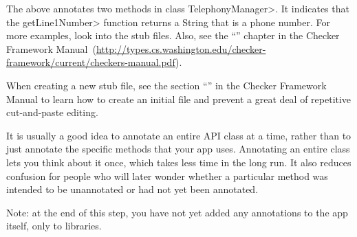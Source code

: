 \noindent
The above annotates two methods in class \<TelephonyManager>.
It indicates that the \<getLine1Number> function returns a String that is a
phone number.  For more examples, look into the stub files. Also, see 
the
``'' chapter in the Checker Framework Manual\ifhevea\else\ (\url{http://types.cs.washington.edu/checker-framework/current/checkers-manual.pdf})\fi.


When creating a new stub file, see the section
``'' in the Checker Framework Manual to learn how to create an
initial file and prevent a great deal of repetitive cut-and-paste editing.


It is usually a good idea to annotate an entire API class at a time, rather
than to just annotate the specific methods that your app uses.  Annotating
an entire class lets you think about it once, which takes less time in the
long run.  It also reduces confusion for people who will later wonder
whether a particular method was intended to be unannotated or had not yet
been annotated.


Note: at the end of this step, you have not yet added any annotations to
the app itself, only to libraries.

%
%
%
%
%
%
%
%


